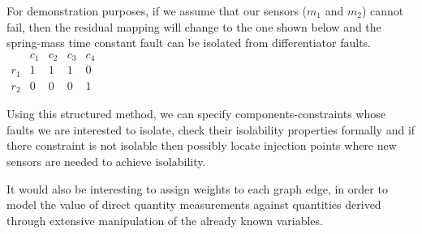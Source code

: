 For demonstration purposes, if we assume that our sensors ($m_1$ and $m_2$) cannot fail, then the residual mapping will change to the one shown below and the spring-mass time constant fault can be isolated from differentiator faults.\\
$\begin{array}{c|cccc}
	\>  & c_1 & c_2 & c_3 & c_4 \\ \hline
	r_1 &  1  &  1  &  1  &  0  \\
	r_2 &  0  &  0  &  0  &  1
\end{array}$

Using this structured method, we can specify components-constraints whose faults we are interested to isolate, check their isolability properties formally and if there constraint is not isolable then possibly locate injection points where new sensors are needed to achieve isolability.

It would also be interesting to assign weights to each graph edge, in order to model the value of direct quantity measurements against quantities derived through extensive manipulation of the already known variables.